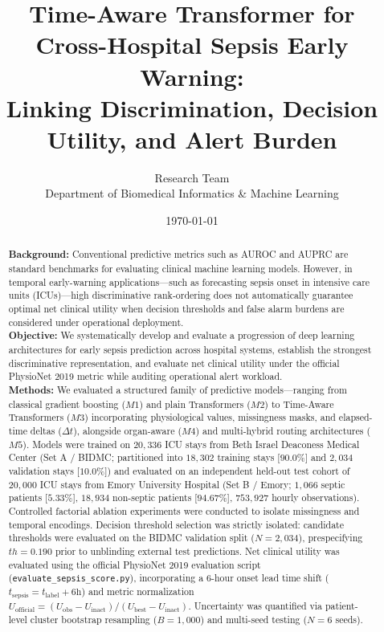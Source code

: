 \documentclass[11pt,a4paper]{article}
\title{\textbf{Time-Aware Transformer for Cross-Hospital Sepsis Early Warning:\\Linking Discrimination, Decision Utility, and Alert Burden}}
\author{
  Research Team\\
  \small Department of Biomedical Informatics \& Machine Learning\\
}
\date{\today}
\begin{document}
\maketitle

\begin{abstract}
\textbf{Background:} Conventional predictive metrics such as AUROC and AUPRC are standard benchmarks for evaluating clinical machine learning models. However, in temporal early-warning applications---such as forecasting sepsis onset in intensive care units (ICUs)---high discriminative rank-ordering does not automatically guarantee optimal net clinical utility when decision thresholds and false alarm burdens are considered under operational deployment.\\[0.5em]
\textbf{Objective:} We systematically develop and evaluate a progression of deep learning architectures for early sepsis prediction across hospital systems, establish the strongest discriminative representation, and evaluate net clinical utility under the official PhysioNet 2019 metric while auditing operational alert workload.\\[0.5em]
\textbf{Methods:} We evaluated a structured family of predictive models---ranging from classical gradient boosting ($M1$) and plain Transformers ($M2$) to Time-Aware Transformers ($M3$) incorporating physiological values, missingness masks, and elapsed-time deltas ($\Delta t$), alongside organ-aware ($M4$) and multi-hybrid routing architectures ($M5$). Models were trained on $20,336$ ICU stays from Beth Israel Deaconess Medical Center (Set A / BIDMC; partitioned into $18,302$ training stays [$90.0\%$] and $2,034$ validation stays [$10.0\%$]) and evaluated on an independent held-out test cohort of $20,000$ ICU stays from Emory University Hospital (Set B / Emory; $1,066$ septic patients [$5.33\%$], $18,934$ non-septic patients [$94.67\%$], $753,927$ hourly observations). Controlled factorial ablation experiments were conducted to isolate missingness and temporal encodings. Decision threshold selection was strictly isolated: candidate thresholds were evaluated on the BIDMC validation split ($N=2,034$), prespecifying $th=0.190$ prior to unblinding external test predictions. Net clinical utility was evaluated using the official PhysioNet 2019 evaluation script (\texttt{evaluate\_sepsis\_score.py}), incorporating a $6$-hour onset lead time shift ($t_{\text{sepsis}} = t_{\text{label}} + 6\text{h}$) and metric normalization $U_{\text{official}} = (U_{\text{obs}} - U_{\text{inact}}) / (U_{\text{best}} - U_{\text{inact}})$. Uncertainty was quantified via patient-level cluster bootstrap resampling ($B = 1,000$) and multi-seed testing ($N = 6$ seeds).\\[0.5em]

\end{abstract}
\end{document}
